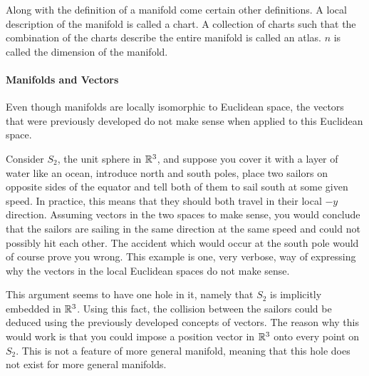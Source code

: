 Along with the definition of a manifold come certain other definitions. A local description of the manifold is called a chart. A collection of charts such that the combination of the charts describe the entire manifold is called an atlas. $n$ is called the dimension of the manifold.

\paragraph{Manifolds and Vectors}
Even though manifolds are locally isomorphic to Euclidean space, the vectors that were previously developed do not make sense when applied to this Euclidean space.

Consider $S_{2}$, the unit sphere in $\mathbb{R}^{3}$, and suppose you cover it with a layer of water like an ocean, introduce north and south poles, place two sailors on opposite sides of the equator and tell both of them to sail south at some given speed. In practice, this means that they should both travel in their local $-y$ direction. Assuming vectors in the two spaces to make sense, you would conclude that the sailors are sailing in the same direction at the same speed and could not possibly hit each other. The accident which would occur at the south pole would of course prove you wrong. This example is one, very verbose, way of expressing why the vectors in the local Euclidean spaces do not make sense.

This argument seems to have one hole in it, namely that $S_{2}$ is implicitly embedded in $\mathbb{R}^{3}$. Using this fact, the collision between the sailors could be deduced using the previously developed concepts of vectors. The reason why this would work is that you could impose a position vector in $\mathbb{R}^{3}$ onto every point on $S_{2}$. This is not a feature of more general manifold, meaning that this hole does not exist for more general manifolds.

